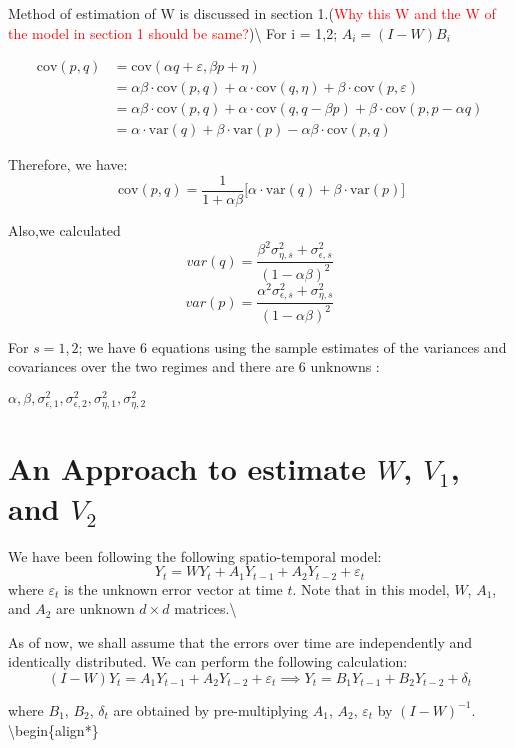 \documentclass[
  12pt,
]{article}
\begin{document}
Method of estimation of W is discussed in section
1.(\textcolor{red}{Why this W and the W of the model in section 1 should be same?})\textbackslash{}
For i = 1,2; \(A_i = (I-W)B_i\)

\begin{align*}
    \text{cov}(p,q) &= \text{cov}(\alpha q + \varepsilon , \beta p + \eta)\\
    &= \alpha\beta\cdot\text{cov}(p,q) + \alpha\cdot\text{cov}(q,\eta) + \beta\cdot\text{cov}(p,\varepsilon)\\
    &= \alpha\beta\cdot\text{cov}(p,q) + \alpha\cdot\text{cov}(q,q - \beta p) + \beta\cdot\text{cov}(p,p - \alpha q)\\
    &= \alpha\cdot\text{var}(q) + \beta\cdot\text{var}(p) - \alpha\beta\cdot\text{cov}(p,q)
\end{align*}

Therefore, we have:
\[~\text{cov}(p,q) = \dfrac{1}{1+\alpha\beta}\Big[\alpha\cdot\text{var}(q) + \beta\cdot\text{var}(p)\Big] \]

Also,we calculated
\[var(q) = \frac{\beta^2 \sigma^2_{\eta,s} + \sigma^2_{\epsilon,s}}{(1-\alpha \beta)^2} \]
\[var(p) = \frac{\alpha^2 \sigma^2_{\epsilon,s} + \sigma^2_{\eta,s}}{(1-\alpha \beta)^2}\]

For \(s=1,2\); we have 6 equations using the sample estimates of the
variances and covariances over the two regimes and there are 6 unknowns
:

\(\alpha, \beta, \sigma^2_{\epsilon,1}, \sigma^2_{\epsilon,2}, \sigma^2_{\eta,1}, \sigma^2_{\eta,2}\)

\section{\textbf{\textcolor{DeepBlue}{An Approach to estimate $W$, $V_1$, and $V_2$}}}

We have been following the following spatio-temporal model:
\[Y_t = W Y_t + A_1 Y_{t-1} + A_2 Y_{t-2} + \varepsilon_t\] where
\(\varepsilon_t\) is the unknown error vector at time \(t\). Note that
in this model, \(W\), \(A_1\), and \(A_2\) are unknown \(d \times d\)
matrices.\textbackslash{}

As of now, we shall assume that the errors over time are independently
and identically distributed. We can perform the following calculation:
\[(I - W) Y_t =  A_1 Y_{t-1} + A_2 Y_{t-2} + \varepsilon_t \implies Y_t =  B_1 Y_{t-1} + B_2 Y_{t-2} + \delta_t\]

where \(B_1\), \(B_2\), \(\delta_t\) are obtained by pre-multiplying
\(A_1\), \(A_2\), \(\varepsilon_t\) by \((I - W)^{-1}\).
\textbackslash begin\{align*\}
\end{document}
